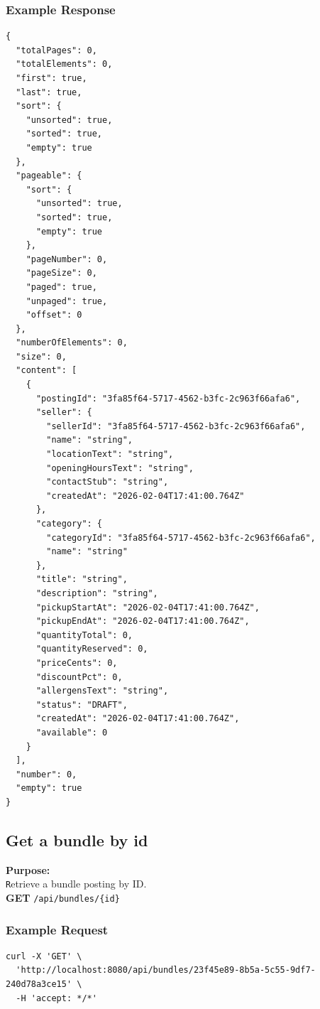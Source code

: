 \documentclass[a4paper,11pt]{article}
\begin{document}
\subsubsection*{Example Response}
\begin{lstlisting}
{
  "totalPages": 0,
  "totalElements": 0,
  "first": true,
  "last": true,
  "sort": {
    "unsorted": true,
    "sorted": true,
    "empty": true
  },
  "pageable": {
    "sort": {
      "unsorted": true,
      "sorted": true,
      "empty": true
    },
    "pageNumber": 0,
    "pageSize": 0,
    "paged": true,
    "unpaged": true,
    "offset": 0
  },
  "numberOfElements": 0,
  "size": 0,
  "content": [
    {
      "postingId": "3fa85f64-5717-4562-b3fc-2c963f66afa6",
      "seller": {
        "sellerId": "3fa85f64-5717-4562-b3fc-2c963f66afa6",
        "name": "string",
        "locationText": "string",
        "openingHoursText": "string",
        "contactStub": "string",
        "createdAt": "2026-02-04T17:41:00.764Z"
      },
      "category": {
        "categoryId": "3fa85f64-5717-4562-b3fc-2c963f66afa6",
        "name": "string"
      },
      "title": "string",
      "description": "string",
      "pickupStartAt": "2026-02-04T17:41:00.764Z",
      "pickupEndAt": "2026-02-04T17:41:00.764Z",
      "quantityTotal": 0,
      "quantityReserved": 0,
      "priceCents": 0,
      "discountPct": 0,
      "allergensText": "string",
      "status": "DRAFT",
      "createdAt": "2026-02-04T17:41:00.764Z",
      "available": 0
    }
  ],
  "number": 0,
  "empty": true
}
\end{lstlisting}

\subsection{Get a bundle by id}
\textbf{Purpose:} \\ \texttt Retrieve a bundle posting by ID. \\

\textbf{GET} \texttt{/api/bundles/\{id\}}

\subsubsection*{Example Request}
\begin{lstlisting}
curl -X 'GET' \
  'http://localhost:8080/api/bundles/23f45e89-8b5a-5c55-9df7-240d78a3ce15' \
  -H 'accept: */*'
\end{lstlisting}
\end{document}
